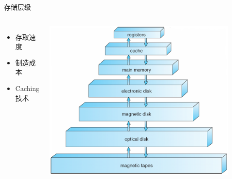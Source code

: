 \documentclass[xcolor=svgnames]{beamer}
\begin{document}
\begin{CJK*}{UTF8}{gbsn}
\begin{frame}{存储层级}
\begin{columns}
\begin{itemize}
\item 存取速度
\item 制造成本
\item Caching技术
\end{itemize}
\includegraphics[width=0.9\textwidth]{storage.png}
\end{columns}
\end{frame}


\end{CJK*}
\end{document}
